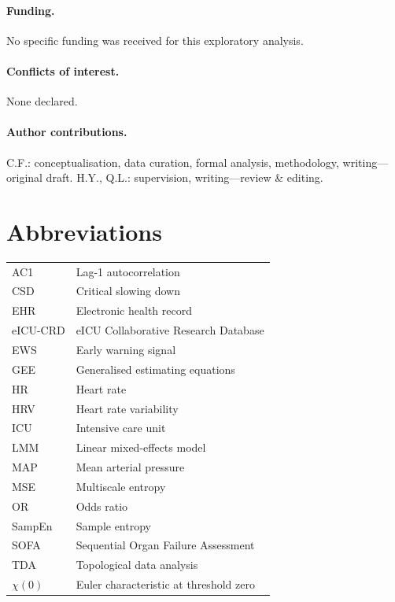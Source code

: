 \documentclass[12pt,a4paper]{article}
\begin{document}
\paragraph{Funding.}
No specific funding was received for this exploratory analysis.

\paragraph{Conflicts of interest.}
None declared.

\paragraph{Author contributions.}
C.F.: conceptualisation, data curation, formal analysis, methodology,
writing—original draft.
H.Y., Q.L.: supervision, writing—review \& editing.

\section*{Abbreviations}
\begin{tabular}{ll}
  AC1         & Lag-1 autocorrelation \\
  CSD         & Critical slowing down \\
  EHR         & Electronic health record \\
  eICU-CRD    & eICU Collaborative Research Database \\
  EWS         & Early warning signal \\
  GEE         & Generalised estimating equations \\
  HR          & Heart rate \\
  HRV         & Heart rate variability \\
  ICU         & Intensive care unit \\
  LMM         & Linear mixed-effects model \\
  MAP         & Mean arterial pressure \\
  MSE         & Multiscale entropy \\
  OR          & Odds ratio \\
  SampEn      & Sample entropy \\
  SOFA        & Sequential Organ Failure Assessment \\
  TDA         & Topological data analysis \\
  $\chi(0)$   & Euler characteristic at threshold zero \\
\end{tabular}
\end{document}
